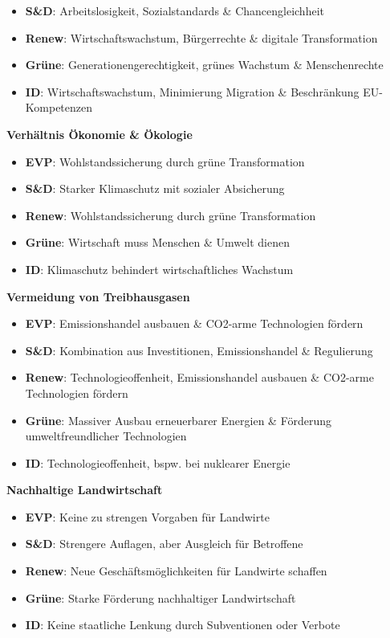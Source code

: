 \documentclass[11pt]{article}
\newcommand{\themeOne}{Verhältnis \newline Ökonomie \& Ökologie}
\newcommand{\themeTwo}{Vermeidung von Treibhausgasen}
\newcommand{\themeThree}{Nachhaltige Landwirtschaft}
\newcommand{\evpOne}{\small Wohlstandssicherung durch grüne Transformation}
\newcommand{\evpTwo}{\small Emissionshandel ausbauen \& CO2-arme Technologien fördern}
\newcommand{\evpThree}{\small Keine zu strengen Vorgaben für Landwirte}
\newcommand{\sdOne}{\small Starker Klimaschutz mit sozialer Absicherung}
\newcommand{\sdTwo}{\small Kombination aus Investitionen, Emissionshandel \& Regulierung}
\newcommand{\sdThree}{\small Strengere Auflagen, aber Ausgleich für Betroffene}
\newcommand{\reOne}{\small Wohlstandssicherung durch grüne Transformation}
\newcommand{\reTwo}{\small Technologieoffenheit, Emissionshandel ausbauen \& CO2-arme Technologien fördern}
\newcommand{\reThree}{\small Neue Geschäftsmöglichkeiten für Landwirte schaffen}
\newcommand{\greenOne}{\small Wirtschaft muss Menschen \& Umwelt dienen}
\newcommand{\greenTwo}{\small Massiver Ausbau erneuerbarer Energien \& Förderung umweltfreundlicher Technologien}
\newcommand{\greenThree}{\small Starke Förderung nachhaltiger Landwirtschaft}
\newcommand{\idOne}{\small Klimaschutz behindert wirtschaftliches Wachstum}
\newcommand{\idTwo}{\small Technologieoffenheit, bspw. bei nuklearer Energie}
\newcommand{\idThree}{\small Keine staatliche Lenkung durch Subventionen oder Verbote}
\newcommand{\themeOne}{Lastenverteilung \newline in der EU}
\newcommand{\themeTwo}{Ausmaß der Kontrolle der EU-Außengrenzen}
\newcommand{\themeThree}{Strenge bezüglich Asylanträge \& Rückführungen}
\newcommand{\evpOne}{\small Fester Verteilungsmechanismus \& Asyl- und Migrationsfonds}
\newcommand{\evpTwo}{\small Stärkere Kontrolle \& Einrichtung von Transitzentren}
\newcommand{\evpThree}{\small Schnellere Rückführungen \& einheitliche Aufnahmebedingungen}
\newcommand{\sdOne}{\small Fester Verteilungsmechanismus, Asyl- und Migrationsfonds \& Unterstützung belastete Staaten}
\newcommand{\sdTwo}{\small Gesicherte Grenzen, aber keine Transitzentren}
\newcommand{\sdThree}{\small Unterstützung bei Antrag \& Integration durch EASO}
\newcommand{\reOne}{\small Fester Verteilungsmechanismus \& Asyl- und Migrationsfonds}
\newcommand{\reTwo}{\small Stärkere Kontrolle \& Einrichtung von Transitzentren}
\newcommand{\reThree}{\small Schnellere Rückführungen \& einheitliche Aufnahmebedingungen}
\newcommand{\greenOne}{\small Fester Verteilungsmechanismus, Asyl- und Migrationsfonds \& Unterstützung belastete Staaten}
\newcommand{\greenTwo}{\small Ausbau der Seenotrettung \& Verhinderung von Transitzentren}
\newcommand{\greenThree}{\small Humane Aufnahme von Schutzsuchenden \& Wahrung der Menschenrechte bei Rückführungen}
\newcommand{\idOne}{\small Keinerlei Verpflichtung der Mitgliedstaaten}
\newcommand{\idTwo}{\small Verhinderung illegaler Migration durch Abschottung}
\newcommand{\idThree}{\small Schnelle Rückführungen, maximal temporäre Aufnahme}
\newcommand{\themeOne}{Internationale \newline Kooperation}
\newcommand{\themeTwo}{Militärische vs. zivile Interventionen}
\newcommand{\themeThree}{Erhöhung von Verteidigungsausgaben}
\newcommand{\evpOne}{\small Ergänzung mit NATO \& keine Parallelstrukturen}
\newcommand{\evpTwo}{\small EU muss Truppen in Krisensituationen schicken können}
\newcommand{\evpThree}{\small Sowohl auf europäischer als auch nationaler Ebene}
\newcommand{\sdOne}{\small Ergänzung mit NATO \& keine Parallelstrukturen}
\newcommand{\sdTwo}{\small Auch Diplomatie \& Abrüstung vorantreiben}
\newcommand{\sdThree}{\small Sowohl auf europäischer als auch nationaler Ebene, aber v.a. effizientere Ausgaben}
\newcommand{\reOne}{\small Ergänzung mit NATO, aber selbstständige EU}
\newcommand{\reTwo}{\small EU muss Truppen in Krisensituationen schicken können}
\newcommand{\reThree}{\small Sowohl auf europäischer als auch nationaler Ebene, aber v.a. effizientere Ausgaben}
\newcommand{\greenOne}{\small Enge Zusammenarbeit mit Demokratien, keine Waffen an Diktaturen}
\newcommand{\greenTwo}{\small v.a. Diplomatie, Umweltschutz \& Entwicklungshilfe für langfristige Sicherheit}
\newcommand{\greenThree}{\small Eher verstärkte EU-Kooperation, um Ausgaben effizienter zu nutzen}
\newcommand{\idOne}{\small NATO nur als Verteidigungsbündnis \& weniger Abhängigkeit}
\newcommand{\idTwo}{\small Militärische Landesverteidigung \& Sicherung der Handelswege}
\newcommand{\idThree}{\small Deutliche Erhöhung auf nationaler Ebene}
\begin{document}
\begin{minipage}[t]{0.45\textwidth}
\begin{itemize}
        \item \textbf{S\&D}: {\small Arbeitslosigkeit, Sozialstandards \& Chancengleichheit}
        \item \textbf{Renew}: {\small Wirtschaftswachstum, Bürgerrechte \& digitale Transformation}
        \item \textbf{Grüne}: {\small Generationengerechtigkeit, grünes Wachstum \& Menschenrechte}
        \item \textbf{ID}: {\small Wirtschaftswachstum, Minimierung Migration \& Beschränkung EU-Kompetenzen}
    \end{itemize}
    
\end{minipage}%
\hfill
\begin{minipage}[t]{0.45\textwidth}
    \textbf{\Large \themeOne}
    \raggedright
    \begin{itemize}
        \item \textbf{EVP}: \evpOne
        \item \textbf{S\&D}: \sdOne
        \item \textbf{Renew}: \reOne
        \item \textbf{Grüne}: \greenOne
        \item \textbf{ID}: \idOne
    \end{itemize}
    \textbf{\Large \themeTwo}
    \raggedright
    \begin{itemize}
        \item \textbf{EVP}: \evpTwo
        \item \textbf{S\&D}: \sdTwo
        \item \textbf{Renew}: \reTwo
        \item \textbf{Grüne}: \greenTwo
        \item \textbf{ID}: \idTwo
    \end{itemize}
    \textbf{\Large \themeThree}
    \raggedright
    \begin{itemize}
        \item \textbf{EVP}: \evpThree
        \item \textbf{S\&D}: \sdThree
        \item \textbf{Renew}: \reThree
        \item \textbf{Grüne}: \greenThree
        \item \textbf{ID}: \idThree
    \end{itemize}
\end{minipage}
\end{document}
